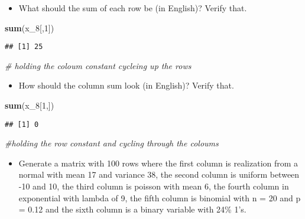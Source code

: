 \documentclass[]{article}
\newenvironment{Shaded}{\begin{snugshade}}{\end{snugshade}}
\newcommand{\KeywordTok}[1]{\textcolor[rgb]{0.13,0.29,0.53}{\textbf{#1}}}
\newcommand{\DecValTok}[1]{\textcolor[rgb]{0.00,0.00,0.81}{#1}}
\newcommand{\CommentTok}[1]{\textcolor[rgb]{0.56,0.35,0.01}{\textit{#1}}}
\newcommand{\NormalTok}[1]{#1}
\providecommand{\tightlist}{%
  \setlength{\itemsep}{0pt}\setlength{\parskip}{0pt}}
\begin{document}
\begin{itemize}
\tightlist
\item
  What should the sum of each row be (in English)? Verify that.
\end{itemize}

\begin{Shaded}
\begin{Highlighting}[]
\KeywordTok{sum}\NormalTok{(x_}\DecValTok{8}\NormalTok{[,}\DecValTok{1}\NormalTok{])}
\end{Highlighting}
\end{Shaded}

\begin{verbatim}
## [1] 25
\end{verbatim}

\begin{Shaded}
\begin{Highlighting}[]
\CommentTok{# holding the coloum constant cycleing up the rows}
\end{Highlighting}
\end{Shaded}

\begin{itemize}
\tightlist
\item
  How should the column sum look (in English)? Verify that.
\end{itemize}

\begin{Shaded}
\begin{Highlighting}[]
\KeywordTok{sum}\NormalTok{(x_}\DecValTok{8}\NormalTok{[}\DecValTok{1}\NormalTok{,])}
\end{Highlighting}
\end{Shaded}

\begin{verbatim}
## [1] 0
\end{verbatim}

\begin{Shaded}
\begin{Highlighting}[]
\CommentTok{#holding the row constant and cycling through the coloums}
\end{Highlighting}
\end{Shaded}

\begin{itemize}
\tightlist
\item
  Generate a matrix with 100 rows where the first column is realization
  from a normal with mean 17 and variance 38, the second column is
  uniform between -10 and 10, the third column is poisson with mean 6,
  the fourth column in exponential with lambda of 9, the fifth column is
  binomial with n = 20 and p = 0.12 and the sixth column is a binary
  variable with 24\% 1's.
\end{itemize}
\end{document}
